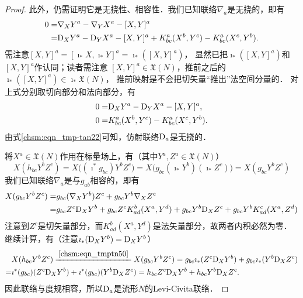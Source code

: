 \begin{proof}
    此外，仍需证明它是无挠性、相容性．我们已知联络${\nabla}_a$是无挠的，即有
    \begin{equation}
    \begin{aligned}
        0=&{\nabla}_{X} Y^a - {\nabla}_{Y} X^a -[{X}, {Y}]^a \\
         =&{\rm D}_{X} Y^a - {\rm D}_{Y} X^a -[X, Y]^a + K^a_{bc} (X^b ,Y^c) -K^a_{bc} (X^c, Y^b) .
    \end{aligned}
    \end{equation}
    需注意$[{X}, {Y}]^a=[\imath_*X, \imath_*Y]^a  =\imath_* ([X,Y]^a)$，
    显然已把$\imath_* ([X,Y]^a)$和$[X,Y]^a$作认同；读者需注意
    $[X,Y]^a\in \mathfrak{X}(N)$，推前之后的$\imath_* ([X,Y]^a)\in \imath_*\mathfrak{X}(N)$，
    推前映射是不会把切矢量“推出”法空间分量的．
    对上式分别取切向部分和法向部分，有
    \begin{align}
        0=& {\rm D}_{X} Y^a - {\rm D}_{Y} X^a -[X, Y]^a, \label{chsm:eqn_tmp-tan22} \\
        0=& K^a_{bc} (X^b, Y^c) -K^a_{bc} (X^c, Y^b). \label{chsm:eqn_tmp-nor22}
    \end{align}
    由式\eqref{chsm:eqn_tmp-tan22}可知，仿射联络${\rm D}_a$是无挠的．

    将$X^a\in \mathfrak{X}(N)$作用在标量场上，有（其中$Y^a,Z^a\in \mathfrak{X}(N)$）
    \begin{equation}\label{chsm:eqn_tmptn50}
         {X}({h}_{bc} {Y}^b {Z}^c) ={X}\bigl((\imath^*g_{bc}) {Y}^b {Z}^c \bigr)
         = {X}\bigl(g_{bc} (\imath_* {Y}^b) (\imath_*{Z}^c) \bigr)
         =X(g_{bc} Y^b Z^c)
    \end{equation}
    我们已知联络${\nabla}_a$是与${g}_{ab}$相容的，即有
    \begin{align*}
        {X}({g}_{bc} {Y}^b {Z}^c) =&  {g}_{bc} ({\nabla}_{X} {Y}^b ){Z}^c +{g}_{bc} {Y}^b {\nabla}_{X}{Z}^c \\
       =& {g}_{bc}{Z}^c {\rm D}_{X} Y^b  +{g}_{bc}{Z}^c  K^b_{ad} (X^a, Y^d)
         +{g}_{bc}{Y}^b {\rm D}_{X} Z^c  +{g}_{bc}{Y}^b  K^c_{ad} (X^a, Z^d)
    \end{align*}
    注意到${Z}^c$是切矢量部分，而$K^b_{ad} (X^a, Y^d)$是法矢量部分，故两者内积必然为零．
    继续计算，有（注意$\imath_*({\rm D}_{X} Y^b) ={\rm D}_{X} Y^b$）
    \setlength{\mathindent}{0em}
    \begin{equation}\label{chsm:eqn_tmptn60}
    \begin{aligned}
        &X(h_{bc} Y^b Z^c)\xlongequal{\ref{chsm:eqn_tmptn50}} {X}({g}_{bc} {Y}^b {Z}^c)=
        {g}_{bc}\imath_* ({Z}^c {\rm D}_{X} Y^b)  +{g}_{bc}\imath_*({Y}^b {\rm D}_{X} Z^c ) \\
        =&\imath^*({g}_{bc})({Z}^c {\rm D}_{X} Y^b)+\imath^*({g}_{bc})({Y}^b {\rm D}_{X} Z^c )
        = h_{bc}{Z}^c {\rm D}_{X} Y^b+ h_{bc} Y^b {\rm D}_{X} Z^c  .
    \end{aligned}
    \end{equation}\setlength{\mathindent}{2em}
    因此联络与度规相容，所以${\rm D}_a$是流形$N$的Levi-Civita联络．
\end{proof}

